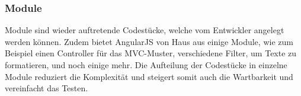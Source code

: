 \subsubsection{Module}

Module sind wieder auftretende Codestücke, welche vom Entwickler angelegt werden können. Zudem bietet AngularJS von Haus aus einige Module, wie zum Beispiel einen Controller für das MVC-Muster, verschiedene Filter, um Texte zu formatieren, und noch einige mehr. Die Aufteilung der Codestücke in einzelne Module reduziert die Komplexität und steigert somit auch die Wartbarkeit und vereinfacht das Testen.